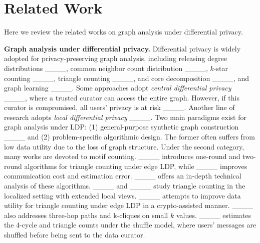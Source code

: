 \section{Related Work}
\label{sec:related}
Here we review the related works on graph analysis under differential privacy. 

\noindent
{\bf Graph analysis under differential privacy.}
Differential privacy is widely adopted for privacy-preserving graph analysis, including releasing degree distributions {____}, 
{common neighbor count distribution ____}, 
$k$-star counting ____, {triangle counting ____}, and core decomposition ____, and {graph learning ____}. 
Some approaches adopt {\em central differential privacy} ____, where a trusted curator can access the entire graph. However, if this curator is compromised, all users' privacy is at risk ____. 
{Another line of research adopts {\em local differential privacy} ____. }
Two main paradigms exist for graph analysis under LDP: 
(1) {general-purpose synthetic graph construction ____} and 
(2) problem-specific algorithmic design. 
The former often suffers from low data utility due to the loss of graph structure. 
Under the second category, many works are devoted to motif counting. 
____ introduces one-round and two-round algorithms for triangle counting under edge LDP, while ____ improves communication cost and estimation error. 
____ offers an in-depth technical analysis of these algorithms. 
____ and ____  study triangle counting in the localized setting with extended local views. 
{____ attempts to improve data utility for triangle counting under edge LDP in a crypto-assisted manner.} 
____ also addresses three-hop paths and k-cliques on small $k$ values. 
____ estimates the 4-cycle and triangle counts under the shuffle model, where users' messages are shuffled before being sent to the data curator. 
